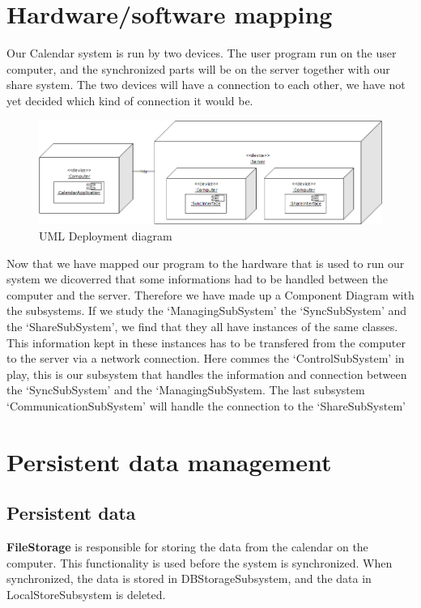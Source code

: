 \newpage
\section*{Hardware/software mapping}

Our Calendar system is run by two devices. The user program run on the user computer, and the synchronized parts will be on the server together with our share system. The two devices will have a connection to each other, we have not yet decided which kind of connection it would be.

\begin{figure}[ht!]
\centering
\includegraphics[width=160mm]{UMLDeployment.png}
\caption{UML Deployment diagram \label{overflow}}
\end{figure}

Now that we have mapped our program to the hardware that is used to run our system we dicoverred that some informations had to be handled between the computer and the server. Therefore we have made up a Component Diagram with the subsystems. If we study the ‘ManagingSubSystem’ the ‘SyncSubSystem’ and the ‘ShareSubSystem’, we find that they all have instances of the same classes. This information kept in these instances has to be transfered from the computer to the server via a network connection. Here commes the ‘ControlSubSystem’ in play, this is our subsystem that handles the information and connection between the ‘SyncSubSystem’ and the ‘ManagingSubSystem. The last subsystem ‘CommunicationSubSystem’ will handle the connection to the ‘ShareSubSystem’


\clearpage
\section*{Persistent data management}
\subsection{Persistent data}

\textbf {FileStorage} is responsible for storing the data from the calendar on the computer. This functionality is used before the system is synchronized. When synchronized, the data is stored in DBStorageSubsystem, and the data in LocalStoreSubsystem is deleted. 

